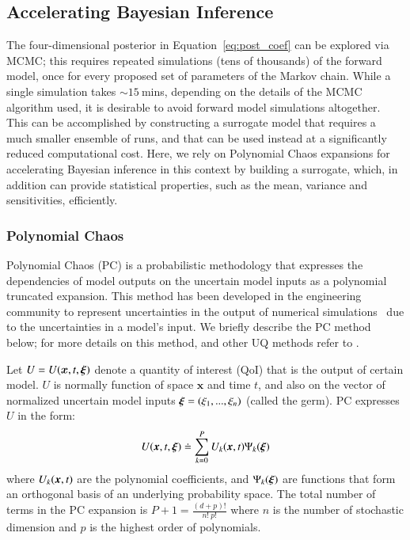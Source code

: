 \subsection{Accelerating Bayesian Inference}
\label{sec:uqpce}


The four-dimensional posterior in Equation~\ref{eq:post_coef} can be explored via MCMC;
this requires repeated simulations (tens of thousands) of the forward \geoclaw model, 
once for every proposed set of parameters of the Markov chain. While a single \geoclaw simulation
takes $\sim 15~$mins, depending on the details of the MCMC algorithm used, it is desirable 
to avoid forward model simulations altogether. This can be accomplished by constructing a 
surrogate model that requires a much
smaller ensemble of \geoclaw runs, and that can be used instead
at a significantly reduced computational cost.  Here, we rely on
Polynomial Chaos expansions for accelerating Bayesian inference in this context 
by building a surrogate, which, in addition can provide statistical properties, such as the mean, variance and sensitivities, efficiently. 

\subsubsection{Polynomial Chaos}

Polynomial Chaos (PC) is a probabilistic methodology that expresses the 
dependencies of model outputs on the uncertain model inputs
as a polynomial truncated expansion. This method has been developed in 
the engineering community to represent uncertainties in the output of 
numerical simulations~\citep{Villegas2012,Lin2009,Xiu2004}
due to the uncertainties in a model's input. We briefly describe the PC
method below; for more details on this method, and other UQ methods
refer to \citep{LeMaitreKnio2010}.

Let $U=U(\bm{x},t,\xxi)$ denote a quantity of 
interest (QoI) that is the output of certain model.
$U$ is normally function of space $\bm{x}$ and time $t$, and 
also on the vector of normalized uncertain model inputs $\xxi=(\xi_1,...,\xi_n)$ (called the germ). 
PC expresses $U$ in the form:
\begin{equation}
  U(\xbold,t,\xxi) \doteq \sum_{k = 0}^P U_k(\xbold,t) \Psi_k(\xxi)
\label{eq:stochseries}
\end{equation} 
where $U_k(\xbold,t)$ are the polynomial coefficients, and
$\Psi_k(\xxi)$ are functions that form an orthogonal basis of an underlying probability
space. The total number of terms in the PC expansion is
$P+1 = \frac{(d+p)! }{n!\ p!}$ where $n$ is the number of stochastic dimension and $p$ is the highest order
of polynomials. 

